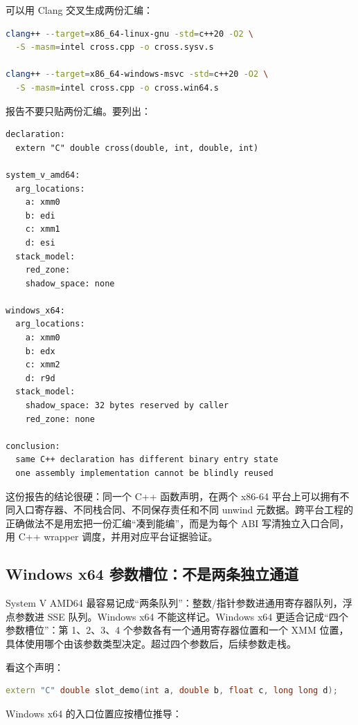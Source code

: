 可以用 Clang 交叉生成两份汇编：

\begin{lstlisting}[language=bash,caption={生成 System V 和 Windows x64 对照汇编}]
clang++ --target=x86_64-linux-gnu -std=c++20 -O2 \
  -S -masm=intel cross.cpp -o cross.sysv.s

clang++ --target=x86_64-windows-msvc -std=c++20 -O2 \
  -S -masm=intel cross.cpp -o cross.win64.s
\end{lstlisting}

报告不要只贴两份汇编。要列出：

\begin{lstlisting}[numbers=none,caption={跨 ABI 对照报告字段}]
declaration:
  extern "C" double cross(double, int, double, int)

system_v_amd64:
  arg_locations:
    a: xmm0
    b: edi
    c: xmm1
    d: esi
  stack_model:
    red_zone:
    shadow_space: none

windows_x64:
  arg_locations:
    a: xmm0
    b: edx
    c: xmm2
    d: r9d
  stack_model:
    shadow_space: 32 bytes reserved by caller
    red_zone: none

conclusion:
  same C++ declaration has different binary entry state
  one assembly implementation cannot be blindly reused
\end{lstlisting}

这份报告的结论很硬：同一个 C++ 函数声明，在两个 x86-64 平台上可以拥有不同入口寄存器、不同栈合同、不同保存责任和不同 unwind 元数据。跨平台工程的正确做法不是用宏把一份汇编“凑到能编”，而是为每个 ABI 写清独立入口合同，用 C++ wrapper 调度，并用对应平台证据验证。

\subsection{Windows x64 参数槽位：不是两条独立通道}

System V AMD64 最容易记成“两条队列”：整数/指针参数进通用寄存器队列，浮点参数进 SSE 队列。Windows x64 不能这样记。Windows x64 更适合记成“四个参数槽位”：第 1、2、3、4 个参数各有一个通用寄存器位置和一个 XMM 位置，具体使用哪个由该参数类型决定。超过四个参数后，后续参数走栈。

看这个声明：

\begin{lstlisting}[language=C++]
extern "C" double slot_demo(int a, double b, float c, long long d);
\end{lstlisting}

Windows x64 的入口位置应按槽位推导：

